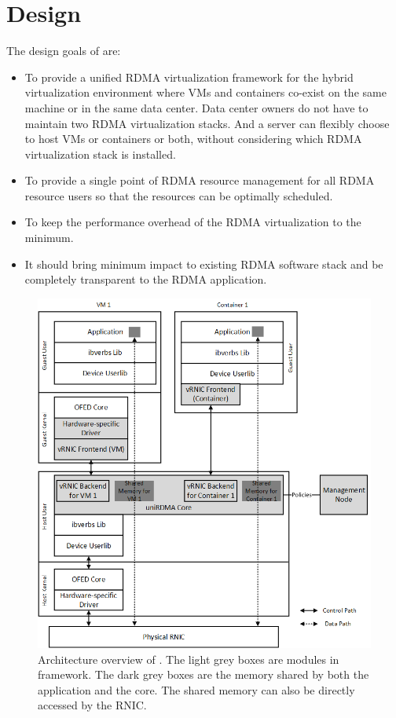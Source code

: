 \section{Design} \label{design}

The design goals of \sys are: 
\begin{itemize}
	\item To provide a unified RDMA virtualization framework for the hybrid virtualization environment where VMs and containers co-exist on the same machine or in the same data center. Data center owners do not have to maintain two RDMA virtualization stacks. And a server can flexibly choose to host VMs or containers or both, without considering which RDMA virtualization stack is installed.
	\item To provide a single point of RDMA resource management for all RDMA resource users so that the resources can be optimally scheduled.
	\item To keep the performance overhead of the RDMA virtualization to the minimum.
	\item It should bring minimum impact to existing RDMA software stack and be completely transparent to the RDMA application.
\end{itemize}

\begin{figure}[!ht]
	\centering
	\includegraphics[width=1\linewidth]{images/framework-overview.png}
	\caption{Architecture overview of \sys. The light grey boxes are modules in \sys framework. The dark grey boxes are the memory shared by both the application and the \sys core. The shared memory can also be directly accessed by the RNIC.}
	\label{fig:framework-overview}
\end{figure}

